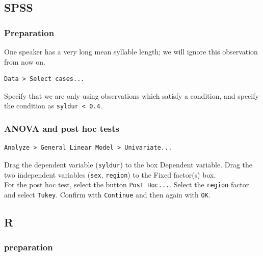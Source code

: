 \documentclass[
]{book}
\newenvironment{Shaded}{\begin{snugshade}}{\end{snugshade}}
\newcommand{\CommentTok}[1]{\textcolor[rgb]{0.56,0.35,0.01}{\textit{#1}}}
\newcommand{\FloatTok}[1]{\textcolor[rgb]{0.00,0.00,0.81}{#1}}
\newcommand{\KeywordTok}[1]{\textcolor[rgb]{0.13,0.29,0.53}{\textbf{#1}}}
\newcommand{\NormalTok}[1]{#1}
\newcommand{\OperatorTok}[1]{\textcolor[rgb]{0.81,0.36,0.00}{\textbf{#1}}}
\newcommand{\StringTok}[1]{\textcolor[rgb]{0.31,0.60,0.02}{#1}}
\begin{document}
\hypertarget{spss-13}{%
\subsection{SPSS}\label{spss-13}}

\hypertarget{preparation-3}{%
\subsubsection{Preparation}\label{preparation-3}}

One speaker has a very long mean syllable length; we will ignore this
observation from now on.

\begin{verbatim}
Data > Select cases...
\end{verbatim}

Specify that we are only using observations which satisfy a condition,
and specify the condition as \texttt{syldur\ \textless{}\ 0.4}.

\hypertarget{anova-and-post-hoc-tests}{%
\subsubsection{ANOVA and post hoc tests}\label{anova-and-post-hoc-tests}}

\begin{verbatim}
Analyze > General Linear Model > Univariate...
\end{verbatim}

Drag the dependent variable (\texttt{syldur}) to the box Dependent
variable. Drag the two independent variables (\texttt{sex}, \texttt{region}) to the
Fixed factor(s) box.\\
For the post hoc test, select the button \texttt{Post\ Hoc...}. Select the
\texttt{region} factor and select \texttt{Tukey}. Confirm with \texttt{Continue} and then again
with \texttt{OK}.

\hypertarget{r-15}{%
\subsection{R}\label{r-15}}

\hypertarget{preparation-4}{%
\subsubsection{preparation}\label{preparation-4}}

\begin{Shaded}
\end{Shaded}
\end{document}
